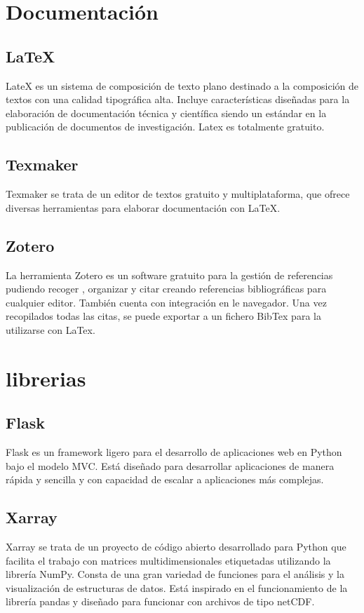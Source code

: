 \section{Documentación}\label{Documentación}
	\subsection{LaTeX}\label{LaTex}
LateX es un sistema de composición de texto plano destinado a la composición de textos con una calidad tipográfica alta. Incluye características diseñadas para la elaboración de documentación técnica y científica siendo un estándar en la publicación de documentos de investigación. Latex es totalmente gratuito.
	\subsection{Texmaker}\label{Texmaker}
Texmaker se trata de un editor de textos gratuito y multiplataforma, que ofrece diversas herramientas para elaborar documentación con LaTeX.
	\subsection{Zotero}\label{zotero}
La herramienta Zotero es un software gratuito para la gestión de referencias pudiendo recoger , organizar y citar creando referencias bibliográficas para cualquier editor. También cuenta con integración en le navegador. Una vez recopilados todas las citas, se puede exportar a un fichero BibTex para la utilizarse con LaTex.\cite{}

\section{librerias}\label{librerias}
\subsection{Flask}\label{Flask}
Flask es un framework ligero para el desarrollo de aplicaciones web en Python bajo el modelo MVC. Está diseñado para desarrollar aplicaciones de manera rápida y sencilla y con capacidad de escalar a aplicaciones más complejas.
\subsection{Xarray}\label{xarray}
Xarray se trata de un proyecto de código abierto desarrollado para Python que facilita el trabajo con matrices multidimensionales etiquetadas utilizando la librería NumPy. Consta de una gran variedad de funciones para el análisis y la visualización de estructuras de datos. Está inspirado en el funcionamiento de la librería pandas y diseñado para funcionar con archivos de tipo netCDF.
